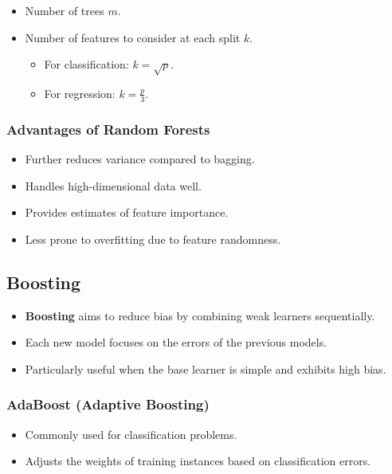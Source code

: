 \documentclass{article}
\begin{document}
\begin{itemize}
    \item Number of trees $m$.
    \item Number of features to consider at each split $k$.
    \begin{itemize}
        \item For classification: $k = \sqrt{p}$.
        \item For regression: $k = \frac{p}{3}$.
    \end{itemize}
\end{itemize}

\subsubsection{Advantages of Random Forests}

\begin{itemize}
    \item Further reduces variance compared to bagging.
    \item Handles high-dimensional data well.
    \item Provides estimates of feature importance.
    \item Less prone to overfitting due to feature randomness.
\end{itemize}

\subsection{Boosting}

\begin{itemize}
    \item \textbf{Boosting} aims to reduce bias by combining weak learners sequentially.
    \item Each new model focuses on the errors of the previous models.
    \item Particularly useful when the base learner is simple and exhibits high bias.
\end{itemize}

\subsubsection{AdaBoost (Adaptive Boosting)}

\begin{itemize}
    \item Commonly used for classification problems.
    \item Adjusts the weights of training instances based on classification errors.
\end{itemize}
\end{document}
